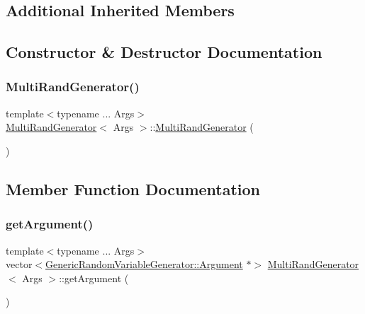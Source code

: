 \subsection*{Additional Inherited Members}


\subsection{Constructor \& Destructor Documentation}
\hypertarget{class_multi_rand_generator_abf466c4d24a1c565abe493b26926f3c1}{}\label{class_multi_rand_generator_abf466c4d24a1c565abe493b26926f3c1} 
\subsubsection{\texorpdfstring{Multi\+Rand\+Generator()}{MultiRandGenerator()}}
{\footnotesize\ttfamily template$<$typename ... Args$>$ \\
\hyperlink{class_multi_rand_generator}{Multi\+Rand\+Generator}$<$ Args $>$\+::\hyperlink{class_multi_rand_generator}{Multi\+Rand\+Generator} (\begin{DoxyParamCaption}{ }\end{DoxyParamCaption})\hspace{0.3cm}{\ttfamily [inline]}}



\subsection{Member Function Documentation}
\hypertarget{class_multi_rand_generator_ab6309c317d42656c99fa0a81a019a48a}{}\label{class_multi_rand_generator_ab6309c317d42656c99fa0a81a019a48a} 
\subsubsection{\texorpdfstring{get\+Argument()}{getArgument()}}
{\footnotesize\ttfamily template$<$typename ... Args$>$ \\
vector$<$\hyperlink{class_generic_random_variable_generator_1_1_argument}{Generic\+Random\+Variable\+Generator\+::\+Argument} $\ast$$>$ \hyperlink{class_multi_rand_generator}{Multi\+Rand\+Generator}$<$ Args $>$\+::get\+Argument (\begin{DoxyParamCaption}{ }\end{DoxyParamCaption})\hspace{0.3cm}{\ttfamily [inline]}}

